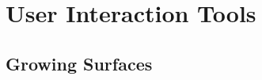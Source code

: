 
\chapter{User Interaction Tools}
\label{sec:UIT}

\section{Growing Surfaces}
\label{sec:GrowingSurfaces}








